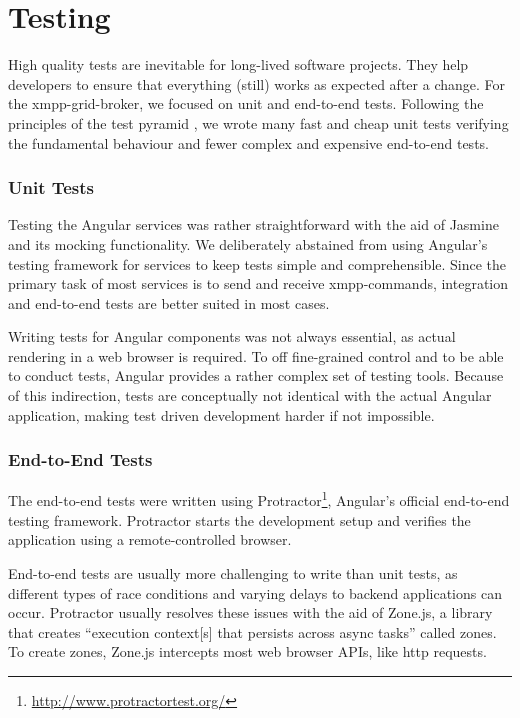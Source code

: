\section{Testing}\label{sec:testing}

High quality tests are inevitable for long-lived software projects.
They help developers to ensure that everything (still) works as expected after a change.
For the \gls{xmpp-grid-broker}, we focused on unit and end-to-end tests.
Following the principles of the test pyramid \cite{Cohn:2009:SAS:1667109}, we wrote many fast and cheap unit tests verifying the fundamental behaviour and fewer complex and expensive end-to-end tests.

\subsubsection{Unit Tests}

Testing the Angular services was rather straightforward with the aid of Jasmine and its mocking functionality.
We deliberately abstained from using Angular's testing framework for services to keep tests simple and comprehensible.
Since the primary task of most services is to send and receive \gls{xmpp}-commands, integration and end-to-end tests are better suited in most cases.

Writing tests for Angular components was not always essential, as actual rendering in a web browser is required.
To off fine-grained control and to be able to conduct tests, Angular provides a rather complex set of testing tools.
Because of this indirection, tests are conceptually not identical with the actual Angular application, making test driven development harder if not impossible.

\subsubsection{End-to-End Tests}

The end-to-end tests were written using Protractor\footnote{\url{http://www.protractortest.org/}}, Angular's official end-to-end testing framework.
Protractor starts the development setup and verifies the application using a remote-controlled browser.

End-to-end tests are usually more challenging to write than unit tests, as different types of race conditions and varying delays to backend applications can occur.
Protractor usually resolves these issues with the aid of Zone.js, a library that creates ``execution context[s] that persists across async tasks'' called zones.
To create zones, Zone.js intercepts most web browser APIs, like \gls{http} requests.~\cite{zone-js-readme}

